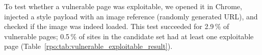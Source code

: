 To test whether a vulnerable page was exploitable, we opened it in Chrome,
injected a style payload with an image reference (randomly generated URL), and
checked if the image was indeed loaded. This test succeeded for 2.9\,\% of
vulnerable pages; 0.5\,\% of sites in the candidate set had at least one
exploitable page (Table~\ref{rpo:tab:vulnerable_exploitable_result}).



% 

% 




